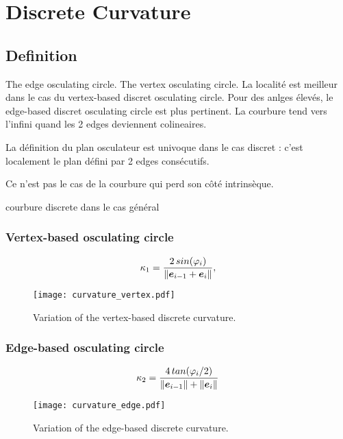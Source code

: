 \section{Discrete Curvature}

\subsection{Definition}

\cite{Hoffmann2008}

The edge osculating circle.
The vertex osculating circle.
La localité est meilleur dans le cas du vertex-based discret osculating circle.
Pour des anlges élevés, le edge-based discret osculating circle est plus pertinent.
La courbure tend vers l'infini quand les 2 edges deviennent colineaires.

La définition du plan osculateur est univoque dans le cas discret : c'est localement le plan défini par 2 edges consécutifs.

Ce n'est pas le cas de la courbure qui perd son côté intrinsèque.

courbure discrete dans le cas général

\subsubsection{Vertex-based osculating circle}

\begin{equation}
	\kappa_1 = \frac{2 \,sin(\varphi_i)}{\|\boldsymbol{e}_{i-1} + \boldsymbol{e}_{i} \|},
\end{equation}

\begin{figure}[] 
\begin{center}
\texttt{[image: curvature\_vertex.pdf]} 
\caption{Variation of the vertex-based discrete curvature.}
\label{fig:1_1}
\end{center}
\end{figure}

\subsubsection{Edge-based osculating circle}

\begin{equation}
	\kappa_2 = \frac{4 \,tan(\varphi_i/2)}{\|\boldsymbol{e}_{i-1}\| + \|\boldsymbol{e}_{i} \|}
\end{equation}

\begin{figure}[] 
\begin{center}
\texttt{[image: curvature\_edge.pdf]} 
\caption{Variation of the edge-based discrete curvature.}
\label{fig:1_1}
\end{center}
\end{figure}



